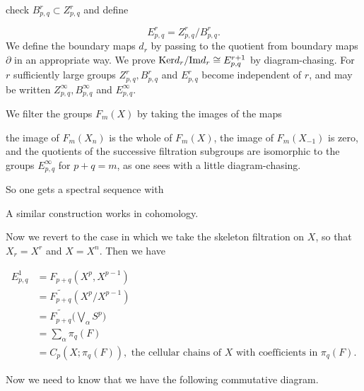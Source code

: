 \documentclass[../main]{subfiles}
\begin{document}
check $B_{p,q}^r\subset Z_{p,q}^r$ and define

\begin{equation*}
    E_{p,q}^r=Z_{p,q}^r/B_{p,q}^r.
\end{equation*}
We define the boundary maps $d_r$ by passing to the quotient from boundary maps $\partial$ in an appropriate way. We prove $\mathrm{Ker}d_r/\mathrm{Im}d_r\cong E_{p,q}^{r+1}$ by diagram-chasing. For $r$ sufficiently large groups $Z_{p,q}^r,B_{p,q}^r$ and $E_{p,q}^r$ become independent of $r$, and may be written $Z_{p,q}^{\infty},B_{p,q}^{\infty}$ and $E_{p,q}^{\infty}$.

We filter the groups $F_m(X)$ by taking the images of the maps
\begin{center}
\end{center}

the image of $F_m(X_n)$ is the whole of $F_m(X)$, the image of $F_m(X_{-1})$ is zero, and the quotients of the successive filtration subgroups are isomorphic to the groups $E_{p,q}^{\infty}$ for $p+q=m$, as one sees with a little diagram-chasing.

So one gets a spectral sequence with 

\begin{center}
\end{center}

A similar construction works in cohomology.

Now we revert to the case in which we take the skeleton filtration on $X$, so that $X_r=X^r$ and $X=X^n$. Then we have

\begin{align*}
    E_{p,q}^1&=F_{p+q}(X^p,X^{p-1})\\
    &=\widetilde{F_{p+q}}(X^p/X^{p-1})\\
    &=\widetilde{F_{p+q}}\bigg(\bigvee_\alpha S^p\bigg)\\
    &=\sum_{\alpha}\pi_q(F)\\
    &=C_p(X;\pi_q(F)),\text{ the cellular chains of }X\text{ with coefficients in }\pi_q(F).
\end{align*}

Now we need to know that we have the following commutative diagram. 
\end{document}
